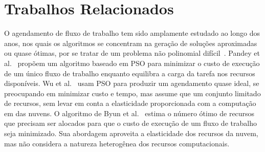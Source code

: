 \section{Trabalhos Relacionados}
\label{sec:Trabalhos}
O agendamento de fluxo de trabalho tem sido amplamente estudado ao longo dos anos, nos quais os algoritmos se concentram na geração de soluções aproximadas ou quase ótimas, por se tratar de um problema não polinomial difícil~\cite{sousa2004}. Pandey et al.~\cite{pandey2010} propõem um algoritmo baseado em PSO para minimizar o custo de execução de um único fluxo de trabalho enquanto equilibra a carga da tarefa nos recursos disponíveis. Wu et al.~\cite{wu2010} usam PSO para produzir um agendamento quase ideal, se preocupando em minimizar custo e tempo, mas assume que um conjunto limitado de recursos, sem levar em conta a elasticidade proporcionada com a computação em das nuvens. O algoritmo de Byun et al.~\citealp{byun2011} estima o número ótimo de recursos que precisam ser alocados para que o custo de execução de um fluxo de trabalho seja minimizado. Sua abordagem aproveita a elasticidade dos recursos da nuvem, mas não considera a natureza heterogênea dos recursos computacionais.
